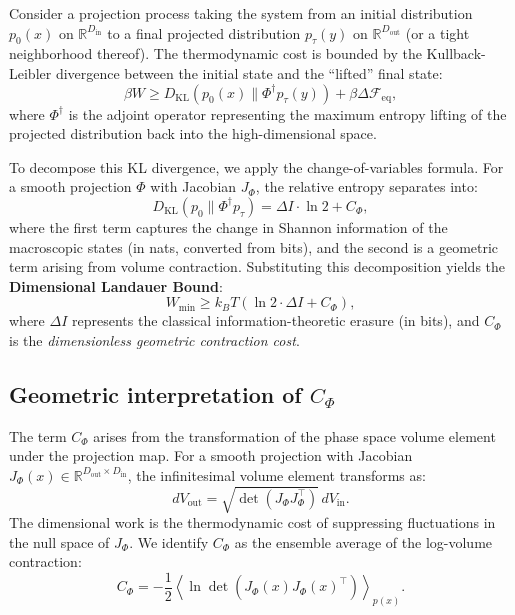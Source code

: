 \documentclass[aps,pre,twocolumn,superscriptaddress,floatfix]{revtex4-2}
\begin{document}
Consider a projection process taking the system from an initial distribution $p_0(x)$ on $\mathbb{R}^{D_{\text{in}}}$ to a final projected distribution $p_\tau(y)$ on $\mathbb{R}^{D_{\text{out}}}$ (or a tight neighborhood thereof). The thermodynamic cost is bounded by the Kullback-Leibler divergence between the initial state and the ``lifted'' final state:
\begin{equation}
    \beta W \ge D_{\text{KL}}(p_0(x) \| \Phi^\dagger p_\tau(y)) + \beta \Delta \mathcal{F}_{\text{eq}},
\end{equation}
where $\Phi^\dagger$ is the adjoint operator representing the maximum entropy lifting of the projected distribution back into the high-dimensional space.

To decompose this KL divergence, we apply the change-of-variables formula. For a smooth projection $\Phi$ with Jacobian $J_\Phi$, the relative entropy separates into:
\begin{equation}
    D_{\text{KL}}(p_0 \| \Phi^\dagger p_\tau) = \Delta I \cdot \ln 2 + C_\Phi,
\end{equation}
where the first term captures the change in Shannon information of the macroscopic states (in nats, converted from bits), and the second is a geometric term arising from volume contraction. Substituting this decomposition yields the \textbf{Dimensional Landauer Bound}:
\begin{equation}
    \boxed{W_{\text{min}} \ge k_B T (\ln 2 \cdot \Delta I + C_\Phi),}
    \label{eq:dim_landauer}
\end{equation}
where $\Delta I$ represents the classical information-theoretic erasure (in bits), and $C_\Phi$ is the \textit{dimensionless geometric contraction cost}.

\subsection{Geometric interpretation of $C_\Phi$}

The term $C_\Phi$ arises from the transformation of the phase space volume element under the projection map. For a smooth projection with Jacobian $J_\Phi(x) \in \mathbb{R}^{D_{\text{out}} \times D_{\text{in}}}$, the infinitesimal volume element transforms as:
\begin{equation}
    dV_{\text{out}} = \sqrt{\det(J_\Phi J_\Phi^\top)} \, dV_{\text{in}}.
\end{equation}
The dimensional work is the thermodynamic cost of suppressing fluctuations in the null space of $J_\Phi$. We identify $C_\Phi$ as the ensemble average of the log-volume contraction:
\begin{equation}
    C_\Phi = -\frac{1}{2} \left\langle \ln \det (J_\Phi(x) J_\Phi(x)^\top) \right\rangle_{p(x)}.
    \label{eq:geometric_cost}
\end{equation}
\end{document}
